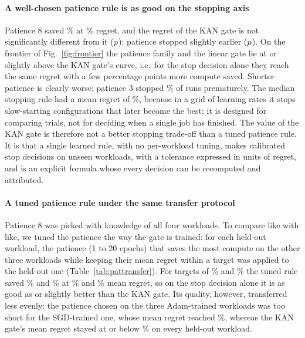 \paragraph{A well-chosen patience rule is as good on the stopping axis} Patience 8 saved \% at \% regret, and the regret of the KAN gate is not significantly different from it ($p\T{lowo}{pateight}{regret}{p}$); patience stopped slightly earlier ($p\T{lowo}{pateight}{stop}{p}$). On the frontier of Fig.~\ref{fig:frontier} the patience family and the linear gate lie at or slightly above the KAN gate's curve, i.e.\ for the stop decision alone they reach the same regret with a few percentage points more compute saved. Shorter patience is clearly worse: patience 3 stopped \% of runs prematurely. The median stopping rule had a mean regret of \%, because in a grid of learning rates it stops slow-starting configurations that later become the best; it is designed for comparing trials, not for deciding when a single job has finished. The value of the KAN gate is therefore not a better stopping trade-off than a tuned patience rule. It is that a single learned rule, with no per-workload tuning, makes calibrated stop decisions on unseen workloads, with a tolerance expressed in units of regret, and is an explicit formula whose every decision can be recomputed and attributed.

\paragraph{A tuned patience rule under the same transfer protocol} Patience 8 was picked with knowledge of all four workloads. To compare like with like, we tuned the patience the way the gate is trained: for each held-out workload, the patience (1 to 20 epochs) that saves the most compute on the other three workloads while keeping their mean regret within a target was applied to the held-out one (Table~\ref{tab:pattransfer}). For targets of \% and \% the tuned rule saved \% and \% at \% and \% mean regret, so on the stop decision alone it is as good as or slightly better than the KAN gate. Its quality, however, transferred less evenly: the patience chosen on the three Adam-trained workloads was too short for the SGD-trained one, whose mean regret reached \%, whereas the KAN gate's mean regret stayed at or below \% on every held-out workload.

